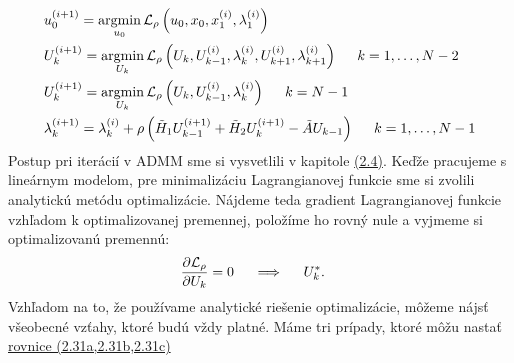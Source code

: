 \begin{subequations}
	\begin{align}
	&u_{0}^{(i+1)} = \operatorname*{argmin}_{u_{0}} \mathcal{L}_{\rho} \left(u_{0},x_{0},x_{1}^{(i)},\lambda_{1}^{(i)}\right)\\
	&U_{k}^{(i+1)} = \operatorname*{argmin}_{U_{k}} \mathcal{L}_{\rho} \left(U_{k},U_{k-1}^{(i)},\lambda_{k}^{(i)},U_{k+1}^{(i)},\lambda_{k+1}^{(i)}\right) \hspace{0.5cm} k=1,\dots,N-2\\
	&U_{k}^{(i+1)} = \operatorname*{argmin}_{U_{k}} \mathcal{L}_{\rho}\left(U_{k},U_{k-1}^{(i)},\lambda_{k}^{(i)}\right) \hspace{0.5cm} k=N-1\\
	&\lambda_{k}^{(i+1)} = \lambda_{k}^{(i)} + \rho\left( \tilde{H}_{1}U_{k-1}^{(i+1)} + \tilde{H}_{2}U_{k}^{(i+1)} - \tilde{A}U_{k-1}\right)\hspace{0.5cm} k=1,\dots,N-1
	\end{align}
\end{subequations}
Postup pri iterácií v ADMM sme si vysvetlili v kapitole \hyperref[subse:ADMM2]{(2.4)}. Keďže pracujeme s lineárnym modelom, pre minimalizáciu Lagrangianovej funkcie sme si zvolili analytickú metódu optimalizácie. Nájdeme teda gradient Lagrangianovej funkcie vzhľadom k optimalizovanej premennej, položíme ho rovný nule a vyjmeme si optimalizovanú premennú:
\begin{align}
&\frac{\partial \mathcal{L}_{\rho}}{\partial U_{k}} = 0  \hspace{0.5cm} \Longrightarrow  \hspace{0.5cm} U_{k}^{*}.
\end{align}
Vzhľadom na to, že používame analytické riešenie optimalizácie, môžeme nájsť všeobecné vzťahy, ktoré budú vždy platné.
Máme tri prípady, ktoré môžu nastať \hyperref[math:Linear_Lagrangean]{rovnice (2.31a,2.31b,2.31c)}
